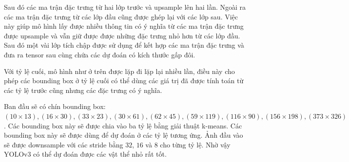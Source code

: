Sau đó các ma trận đặc trưng từ hai lớp trước và upsample lên hai lần. Ngoài ra các ma trận đặc trưng từ các lớp đầu cũng được ghép lại với các lớp sau. Việc này giúp mô hình lấy được nhiều thông tin có ý nghĩa từ các ma trận đặc trưng được upsample và vẫn giữ được được những đặc trưng nhỏ hơn từ các lớp đầu. Sau đó một vài lớp tích chập được sử dụng để kết hợp các ma trận đặc trưng và đưa ra tensor sau cùng chứa các dự đoán có kích thước gấp đôi.

Với tỷ lệ cuối, mô hình như ở trên được lặp đi lặp lại nhiều lần, điều này cho phép các bounding box ở tỷ lệ cuối có thể dùng các giá trị đã được tính toán từ các tỷ lệ trước cũng nhưng các đặc trưng có ý nghĩa.

Ban đầu sẽ có chín bounding box: $(10 \times 13),(16 \times 30),(33 \times 23),(30 \times 61),(62 \times 45),(59 \times 119),(116 \times 90),(156 \times 198),(373 \times 326)$. Các bounding box này sẽ được chia vào ba tỷ lệ bằng giải thuật k-means. Các bounding box này sẽ được dùng để dự đoán ở các tỷ lệ tương ứng. Ảnh đầu vào sẽ được downsample với các stride bằng $32$, $16$ và $8$ cho từng tỷ lệ. Nhờ vậy YOLOv3 có thể dự đoán được các vật thể nhỏ rất tốt.


